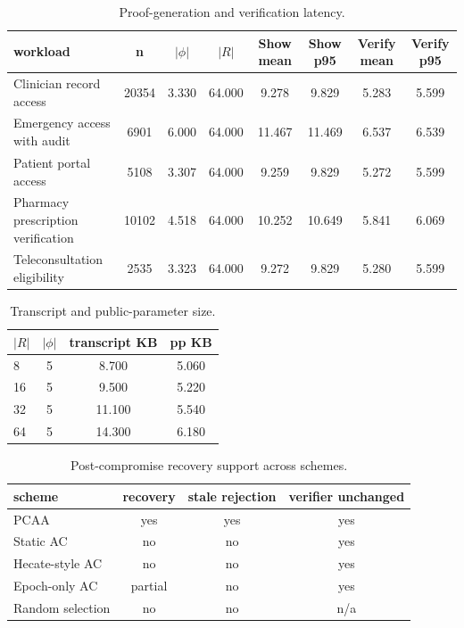 \begin{table}[t]
\centering
\caption{Proof-generation and verification latency.}
\label{tab:proof-verify}
\begin{tabular}{@{}lccccccc@{}}
\toprule
workload & n & $|\phi|$ & $|R|$ & Show mean & Show p95 & Verify mean & Verify p95 \\
\midrule
Clinician record access & 20354 & 3.330 & 64.000 & 9.278 & 9.829 & 5.283 & 5.599 \\
Emergency access with audit & 6901 & 6.000 & 64.000 & 11.467 & 11.469 & 6.537 & 6.539 \\
Patient portal access & 5108 & 3.307 & 64.000 & 9.259 & 9.829 & 5.272 & 5.599 \\
Pharmacy prescription verification & 10102 & 4.518 & 64.000 & 10.252 & 10.649 & 5.841 & 6.069 \\
Teleconsultation eligibility & 2535 & 3.323 & 64.000 & 9.272 & 9.829 & 5.280 & 5.599 \\
\bottomrule
\end{tabular}
\end{table}

\begin{table}[t]
\centering
\caption{Transcript and public-parameter size.}
\label{tab:size}
\begin{tabular}{@{}lccc@{}}
\toprule
$|R|$ & $|\phi|$ & transcript KB & pp KB \\
\midrule
8 & 5 & 8.700 & 5.060 \\
16 & 5 & 9.500 & 5.220 \\
32 & 5 & 11.100 & 5.540 \\
64 & 5 & 14.300 & 6.180 \\
\bottomrule
\end{tabular}
\end{table}

\begin{table}[t]
\centering
\caption{Post-compromise recovery support across schemes.}
\label{tab:recovery-baseline}
\begin{tabular}{@{}lccc@{}}
\toprule
scheme & recovery & stale rejection & verifier unchanged \\
\midrule
PCAA & yes & yes & yes \\
Static AC & no & no & yes \\
Hecate-style AC & no & no & yes \\
Epoch-only AC & partial & no & yes \\
Random selection & no & no & n/a \\
\bottomrule
\end{tabular}
\end{table}

